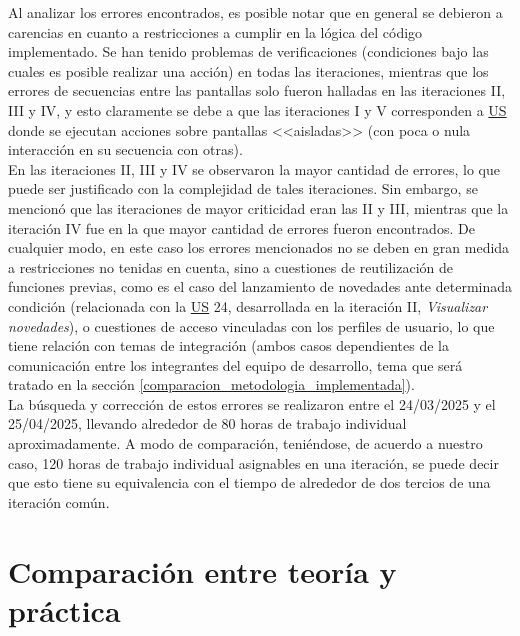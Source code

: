 \documentclass[a4paper, 12pt,twoside]{report}  %
\numberwithin{equation}{subsection} %
\begin{document}
\indent Al analizar los errores encontrados, es posible notar que en general se debieron a carencias en cuanto a restricciones a cumplir en la lógica del código implementado. Se han tenido problemas de verificaciones (condiciones bajo las cuales es posible realizar una acción) en todas las iteraciones, mientras que los errores de secuencias entre las pantallas solo fueron halladas en las iteraciones II, III y IV, y esto claramente se debe a que las iteraciones I y V corresponden a \hyperlink{US}{US} donde se ejecutan acciones sobre pantallas <<aisladas>> (con poca o nula interacción en su secuencia con otras).\\
\indent En las iteraciones II, III y IV se observaron la mayor cantidad de errores, lo que puede ser justificado con la complejidad de tales iteraciones. Sin embargo, se mencionó que las iteraciones de mayor criticidad eran las II y III, mientras que la iteración IV fue en la que mayor cantidad de errores fueron encontrados. De cualquier modo, en este caso los errores mencionados no se deben en gran medida a restricciones no tenidas en cuenta, sino a cuestiones de reutilización de funciones previas, como es el caso del lanzamiento de novedades ante determinada condición (relacionada con la \hyperlink{US}{US} 24, desarrollada en la iteración II, \textit{Visualizar novedades}), o cuestiones de acceso vinculadas con los perfiles de usuario, lo que tiene relación con temas de integración (ambos casos dependientes de la comunicación entre los integrantes del equipo de desarrollo, tema que será tratado en la sección \ref{comparacion_metodologia_implementada}).\\
\indent La búsqueda y corrección de estos errores se realizaron entre el 24/03/2025 y el 25/04/2025, llevando alrededor de 80 horas de trabajo individual aproximadamente. A modo de comparación, teniéndose, de acuerdo a nuestro caso, 120 horas de trabajo individual asignables en una iteración, se puede decir que esto tiene su equivalencia con el tiempo de alrededor de dos tercios de una iteración común.


\chapter{Comparación entre teoría y práctica}
\end{document}
